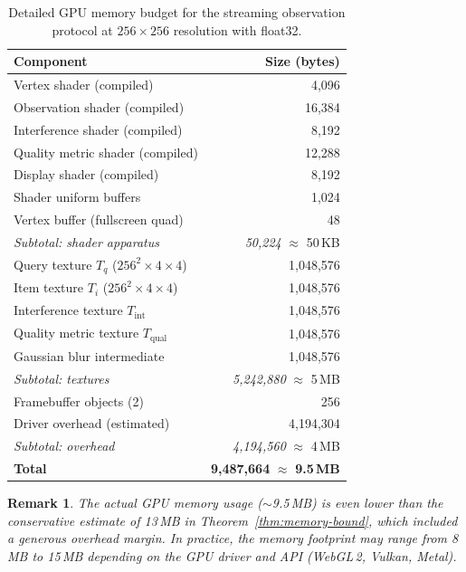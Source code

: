 \documentclass[11pt,twocolumn,a4paper]{article}
\newtheorem{remark}[theorem]{Remark}
\begin{document}
\begin{table}[H]
\centering
\caption{Detailed GPU memory budget for the streaming observation
protocol at $256 \times 256$ resolution with float32.}
\label{tab:memory}
\begin{tabular}{lr}
\toprule
\textbf{Component} & \textbf{Size (bytes)} \\
\midrule
Vertex shader (compiled) & 4,096 \\
Observation shader (compiled) & 16,384 \\
Interference shader (compiled) & 8,192 \\
Quality metric shader (compiled) & 12,288 \\
Display shader (compiled) & 8,192 \\
Shader uniform buffers & 1,024 \\
Vertex buffer (fullscreen quad) & 48 \\
\midrule
\textit{Subtotal: shader apparatus} & \textit{50,224}
  $\approx$ 50\,KB \\
\midrule
Query texture $T_q$ ($256^2 \times 4 \times 4$) & 1,048,576 \\
Item texture $T_i$ ($256^2 \times 4 \times 4$) & 1,048,576 \\
Interference texture $T_{\mathrm{int}}$ & 1,048,576 \\
Quality metric texture $T_{\mathrm{qual}}$ & 1,048,576 \\
Gaussian blur intermediate & 1,048,576 \\
\midrule
\textit{Subtotal: textures} & \textit{5,242,880}
  $\approx$ 5\,MB \\
\midrule
Framebuffer objects (2) & 256 \\
Driver overhead (estimated) & 4,194,304 \\
\midrule
\textit{Subtotal: overhead} & \textit{4,194,560}
  $\approx$ 4\,MB \\
\midrule
\textbf{Total} & \textbf{9,487,664}
  $\approx$ \textbf{9.5\,MB} \\
\bottomrule
\end{tabular}
\end{table}

\begin{remark}
The actual GPU memory usage ($\sim$9.5\,MB) is even lower than the
conservative estimate of 13\,MB in Theorem~\ref{thm:memory-bound},
which included a generous overhead margin. In practice, the memory
footprint may range from 8\,MB to 15\,MB depending on the GPU driver
and API (WebGL\,2, Vulkan, Metal).
\end{remark}
\end{document}
